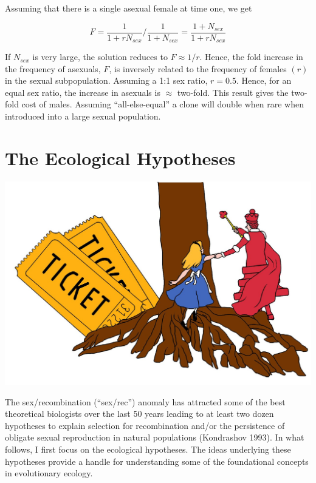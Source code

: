 \documentclass[
  letterpaper,
]{book}
\begin{document}
\begin{tcolorbox}
Assuming that there is a single asexual female at time one, we get

\[F = \frac{1}{1 + rN_{sex}}/\frac{1}{1 + N_{sex}} = \frac{1 + N_{sex}}{1 + rN_{sex}}\]

If \(N_{sex}\) is very large, the solution reduces to \(F \approx 1/r\).
Hence, the fold increase in the frequency of asexuals, \(F\), is
inversely related to the frequency of females \((r)\) in the sexual
subpopulation. Assuming a 1:1 sex ratio, \(r = 0.5\). Hence, for an
equal sex ratio, the increase in asexuals is \(\approx\) two-fold. This
result gives the two-fold cost of males. Assuming ``all-else-equal'' a
clone will double when rare when introduced into a large sexual
population.

\end{tcolorbox}



\chapter{The Ecological Hypotheses}\label{sec-eco-hyp}

\begin{center}
\includegraphics{images/fig2-1.jpeg}
\end{center}

The sex/recombination (``sex/rec'') anomaly has attracted some of the
best theoretical biologists over the last 50 years leading to at least
two dozen hypotheses to explain selection for recombination and/or the
persistence of obligate sexual reproduction in natural populations
(Kondrashov 1993). In what follows, I first focus on the ecological
hypotheses. The ideas underlying these hypotheses provide a handle for
understanding some of the foundational concepts in evolutionary ecology.
\end{document}

